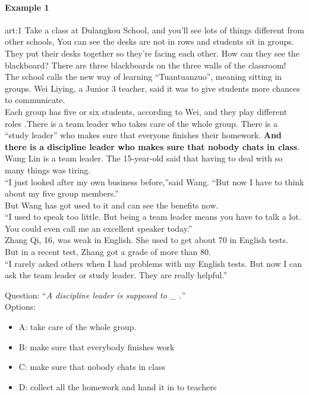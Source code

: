 \paragraph{Example 1}
\label{ex:1}
\begin{passage}{art:1}
Take a class at Dulangkou School, and you'll see lots of things different from other schools, You can see the desks are not in rows and students sit in groups. They put their desks together so they're facing each other. How can they see the blackboard? There are three blackboards on the three walls of the classroom! \\
The school calls the new way of learning ``Tuantuanzuo'', meaning sitting in groups. Wei Liying, a Junior 3 teacher, said it was to give students more chances to communicate. \\
Each group has five or six students, according to Wei, and they play different roles .There is a team leader who takes care of the whole group. There is a ``study leader'' who makes sure that everyone finishes their homework. \textbf{And there is a discipline leader who makes sure that nobody chats in class}. \\
Wang Lin is a team leader. The 15-year-old said that having to deal with so many things was tiring. \\
``I just looked after my own business before,''said Wang. ``But now I have to think about my five group members.'' \\
But Wang has got used to it and can see the benefits now. \\
``I used to speak too little. But being a team leader means you have to talk a lot. You could even call me an excellent speaker today.'' \\
Zhang Qi, 16, was weak in English. She used to get about 70 in English tests. But in a recent test, Zhang got a grade of more than 80.\\
``I rarely  asked others when I had problems with my English tests. But now I can ask the team leader or study leader. They are really helpful.''
\end{passage}
Question: ``\emph{A discipline leader is supposed to  \_  .}''\\
Options: 
\begin{itemize}
 \item A: take care of the whole group.
 \item B: make sure that everybody finishes work
 \item C: make sure that nobody chats in class
 \item D: collect all the homework and hand it in to teachers
\end{itemize}
